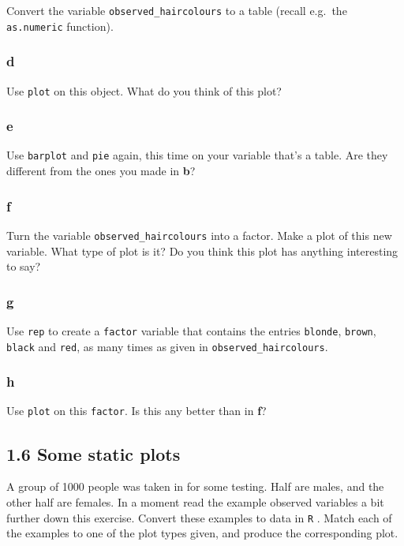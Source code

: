 \documentclass[]{article}
\begin{document}
Convert the variable \texttt{observed\_haircolours} to a table (recall
e.g.~the \texttt{as.numeric} function).

\hypertarget{d-3}{%
\subsubsection{d}\label{d-3}}

Use \texttt{plot} on this object. What do you think of this plot?

\hypertarget{e-1}{%
\subsubsection{e}\label{e-1}}

Use \texttt{barplot} and \texttt{pie} again, this time on your variable
that's a table. Are they different from the ones you made in \textbf{b}?

\hypertarget{f}{%
\subsubsection{f}\label{f}}

Turn the variable \texttt{observed\_haircolours} into a factor. Make a
plot of this new variable. What type of plot is it? Do you think this
plot has anything interesting to say?

\hypertarget{g}{%
\subsubsection{g}\label{g}}

Use \texttt{rep} to create a \texttt{factor} variable that contains the
entries \texttt{blonde}, \texttt{brown}, \texttt{black} and
\texttt{red}, as many times as given in \texttt{observed\_haircolours}.

\hypertarget{h}{%
\subsubsection{h}\label{h}}

Use \texttt{plot} on this \texttt{factor}. Is this any better than in
\textbf{f}?

\hypertarget{some-static-plots}{%
\subsection{1.6 Some static plots}\label{some-static-plots}}

A group of 1000 people was taken in for some testing. Half are males,
and the other half are females. In a moment read the example observed
variables a bit further down this exercise. Convert these examples to
data in \texttt{R} . Match each of the examples to one of the plot types
given, and produce the corresponding plot.
\end{document}

